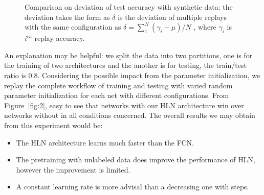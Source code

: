 \documentclass[3p,times,procedia]{elsarticle}
\begin{document}
\begin{figure}[h]
	\centering
	\hspace{-8mm}
	\hspace{-8mm}
	\caption{
		Comparison on deviation of test
		accuracy with synthetic data:
		the deviation takes the form as
		$\delta$ is the deviation of
		multiple replays with the same
		configuration as 
		$\delta=\sum_1^N(\gamma_i-\mu)/N$
		, where $\gamma_i$ is $i^{th}$ 
		replay accuracy.
		}
	\label{fig:3}
\end{figure}

An explanation may be helpful:
we split the data into two partitions, 
one is for the training of two
architectures and the another is for
testing, the train/test ratio is 0.8.
Considering the possible impact from
the parameter initialization, 
we replay the complete workflow
of training and testing with varied
random parameter initialization
for each net with different 
configurations.
From Figure~\ref{fig:2}, easy
to see that networks with our HLN 
architecture win over networks without 
in all conditions concerned.
The overall results we may obtain
from this experiment would be:
\begin{itemize}
	\item The HLN architecture 
		learns much faster than the 
		FCN.
	\item The pretraining
		with unlabeled data does improve 
		the performance of HLN, however 
		the improvement is limited.
	\item A constant learning rate is
		more advisal than a decreasing 
		one with steps.
\end{itemize}
\end{document}
